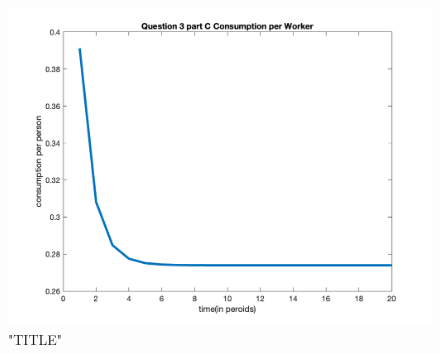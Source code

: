 \begin{enumerate}
     \begin{figure}[H]
        \centering
        \includegraphics[width =.75\linewidth]{HW2/pics/HW1_Q3_c_consumption.png}
        \caption{"TITLE"}
    \end{figure}
\end{enumerate}